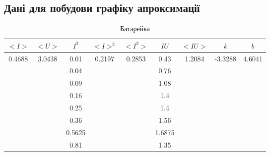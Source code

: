 \documentclass[a4paper,12pt]{article}
\begin{document}
	\begin{center}
		\subsection*{\LARGE{Дані для побудови графіку апроксимації}}
	\end{center}
	\begin{table}[htbp]
		\centering
		\caption{Батарейка}
		\begin{tabular}{|c|c|c|c|c|c|c|c|c|}
			\hline
			\textbf{$<I>$}          & \textbf{$<U>$}          & \textbf{$I^2$} & \textbf{$<I>^2$}        & \textbf{$<I^2>$}        & \textbf{$IU$} & \textbf{$<IU>$}         & \textbf{$k$}             & \textbf{$b$}            \\ \hline
			\multirow{8}{*}{0.4688} & \multirow{8}{*}{3.0438} & 0.01           & \multirow{8}{*}{0.2197} & \multirow{8}{*}{0.2853} & 0.43          & \multirow{8}{*}{1.2084} & \multirow{8}{*}{-3.3288} & \multirow{8}{*}{4.6041} \\ \cline{3-3} \cline{6-6}
			&                         & 0.04           &                         &                         & 0.76          &                         &                          &                         \\ \cline{3-3} \cline{6-6}
			&                         & 0.09           &                         &                         & 1.08          &                         &                          &                         \\ \cline{3-3} \cline{6-6}
			&                         & 0.16           &                         &                         & 1.4           &                         &                          &                         \\ \cline{3-3} \cline{6-6}
			&                         & 0.25           &                         &                         & 1.4           &                         &                          &                         \\ \cline{3-3} \cline{6-6}
			&                         & 0.36           &                         &                         & 1.56          &                         &                          &                         \\ \cline{3-3} \cline{6-6}
			&                         & 0.5625         &                         &                         & 1.6875        &                         &                          &                         \\ \cline{3-3} \cline{6-6}
			&                         & 0.81           &                         &                         & 1.35          &                         &                          &                         \\ \hline
		\end{tabular}
	\end{table}
	
\end{document}
